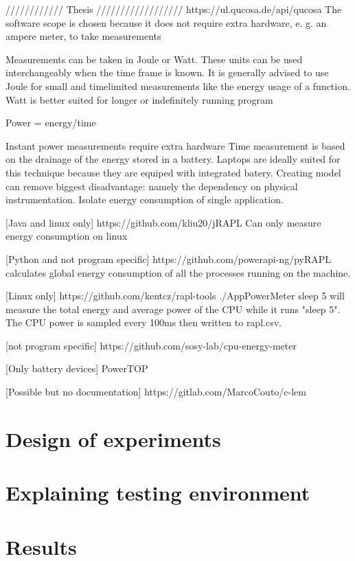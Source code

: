 \documentclass[../thesis.tex]{subfiles}
\begin{document}
//////////// Thesis //////////////////
https://ul.qucosa.de/api/qucosa%
The software scope is chosen because it does not require extra hardware,
e. g. an ampere meter, to take measurements

Measurements can be taken in Joule or Watt. These units can be used interchangeably
when the time frame is known. It is generally advised to use Joule for small and timelimited measurements like the energy usage of a function. Watt is better suited for
longer or indefinitely running program

Power = energy/time

Instant power measurements require extra hardware
Time measurement is based on the drainage of the energy stored in a battery. Laptops are ideally suited for this technique because they are equiped with integrated batery.
Creating model can remove biggest disadvantage: namely the dependency on physical instrumentation. Isolate energy consumption of single application.  

[Java and linux only]
https://github.com/kliu20/jRAPL
Can only measure energy consumption on linux

[Python and not program specific]
https://github.com/powerapi-ng/pyRAPL
calculates global energy consumption of all the processes running on the machine. 

[Linux only]
https://github.com/kentcz/rapl-tools
./AppPowerMeter sleep 5
will measure the total energy and average power of the CPU while it runs "sleep 5". The CPU power is sampled every 100ms then written to rapl.csv.

[not program specific]
https://github.com/sosy-lab/cpu-energy-meter

[Only battery devices]
PowerTOP

[Possible but no documentation]
https://gitlab.com/MarcoCouto/c-lem
\section{Design of experiments}
\section{Explaining testing environment}
\section{Results}
\end{document}
